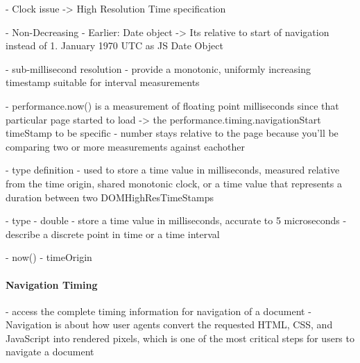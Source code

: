 - Clock issue -> High Resolution Time specification

- Non-Decreasing
- Earlier: Date object
-> Its relative to start of navigation instead of 1. January 1970 UTC as JS Date Object

- sub-millisecond resolution
- provide a monotonic, uniformly increasing timestamp suitable for interval measurements


- performance.now() is a measurement of floating point milliseconds since that particular page started to load
-> the performance.timing.navigationStart timeStamp to be specific
- number stays relative to the page because you'll be comparing two or more measurements against eachother



- type definition
-  used to store a time value in milliseconds, measured relative from the time origin, shared monotonic clock, or a time value that represents a duration between two DOMHighResTimeStamps
	
- type
- double
-  store a time value in milliseconds,  accurate to 5 microseconds
- describe a discrete point in time or a time interval



- now()
- timeOrigin









\paragraph{Navigation Timing}



- access the complete timing information for navigation of a document
- Navigation is about how user agents convert the requested HTML, CSS, and JavaScript into rendered pixels, which is one of the most critical steps for users to navigate a document


